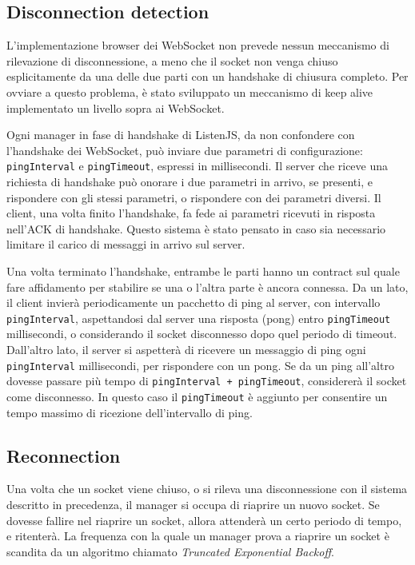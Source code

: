 \documentclass[12pt,a4paper,openright,twoside]{report}
\begin{document}
\subsection{Disconnection detection}

L'implementazione browser dei WebSocket non prevede nessun meccanismo di rilevazione di disconnessione, a meno che il socket non venga chiuso esplicitamente da una delle due parti con un handshake di chiusura completo. Per ovviare a questo problema, è stato sviluppato un meccanismo di keep alive implementato un livello sopra ai WebSocket.

\bigskip

Ogni manager in fase di handshake di ListenJS, da non confondere con l'handshake dei WebSocket, può inviare due parametri di configurazione: \lstinline{pingInterval} e \lstinline{pingTimeout}, espressi in millisecondi. Il server che riceve una richiesta di handshake può onorare i due parametri in arrivo, se presenti, e rispondere con gli stessi parametri, o rispondere con dei parametri diversi. Il client, una volta finito l'handshake, fa fede ai parametri ricevuti in risposta nell'ACK di handshake. Questo sistema è stato pensato in caso sia necessario limitare il carico di messaggi in arrivo sul server.

Una volta terminato l'handshake, entrambe le parti hanno un contract sul quale fare affidamento per stabilire se una o l'altra parte è ancora connessa.
Da un lato, il client invierà periodicamente un pacchetto di ping al server, con intervallo \lstinline{pingInterval}, aspettandosi dal server una risposta (pong) entro \lstinline{pingTimeout} millisecondi, o considerando il socket disconnesso dopo quel periodo di timeout.
Dall'altro lato, il server si aspetterà di ricevere un messaggio di ping ogni \lstinline{pingInterval} millisecondi, per rispondere con un pong. Se da un ping all'altro dovesse passare più tempo di \lstinline{pingInterval + pingTimeout}, considererà il socket come disconnesso. In questo caso il \lstinline{pingTimeout} è aggiunto per consentire un tempo massimo di ricezione dell'intervallo di ping.

\subsection{Reconnection}
Una volta che un socket viene chiuso, o si rileva una disconnessione con il sistema descritto in precedenza, il manager si occupa di riaprire un nuovo socket. Se dovesse fallire nel riaprire un socket, allora attenderà un certo periodo di tempo, e ritenterà. La frequenza con la quale un manager prova a riaprire un socket è scandita da un algoritmo chiamato \textit{Truncated Exponential Backoff}.
\end{document}
